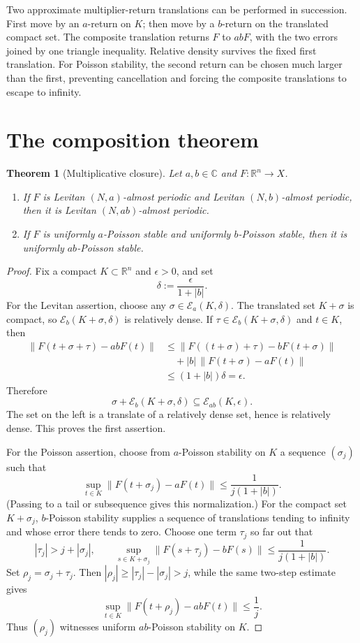 \documentclass[11pt]{article}
\newtheorem{theorem}{Theorem}
\newcommand{\Rd}{\mathbb R^n}
\newcommand{\E}{\mathcal E}
\begin{document}
Two approximate multiplier-return translations can be performed in
succession.  First move by an $a$-return on $K$; then move by a $b$-return
on the translated compact set.  The composite translation returns $F$ to
$abF$, with the two errors joined by one triangle inequality.  Relative
density survives the fixed first translation.  For Poisson stability, the
second return can be chosen much larger than the first, preventing
cancellation and forcing the composite translations to escape to infinity.

\section*{The composition theorem}

\begin{theorem}[Multiplicative closure]\label{thm:composition}
Let $a,b\in\mathbb C$ and $F:\Rd\to X$.
\begin{enumerate}
\item If $F$ is Levitan $(N,a)$-almost periodic and Levitan
      $(N,b)$-almost periodic, then it is Levitan $(N,ab)$-almost periodic.
\item If $F$ is uniformly $a$-Poisson stable and uniformly $b$-Poisson
      stable, then it is uniformly $ab$-Poisson stable.
\end{enumerate}
\end{theorem}

\begin{proof}
Fix a compact $K\subset\Rd$ and $\epsilon>0$, and set
\[
 \delta:=\frac{\epsilon}{1+|b|}.
\]
For the Levitan assertion, choose any
$\sigma\in\E_a(K,\delta)$.  The translated set $K+\sigma$ is compact, so
$\E_b(K+\sigma,\delta)$ is relatively dense.  If
$\tau\in\E_b(K+\sigma,\delta)$ and $t\in K$, then
\begin{align*}
 \|F(t+\sigma+\tau)-abF(t)\|
 &\le \|F((t+\sigma)+\tau)-bF(t+\sigma)\|\\
 &\quad+|b|\,\|F(t+\sigma)-aF(t)\|\\
 &\le (1+|b|)\delta=\epsilon.
\end{align*}
Therefore
\[
 \sigma+\E_b(K+\sigma,\delta)
 \subseteq \E_{ab}(K,\epsilon).
\]
The set on the left is a translate of a relatively dense set, hence is
relatively dense.  This proves the first assertion.

For the Poisson assertion, choose from $a$-Poisson stability on $K$ a
sequence $(\sigma_j)$ such that
\[
 \sup_{t\in K}\|F(t+\sigma_j)-aF(t)\|
 \le \frac{1}{j(1+|b|)}.
\]
(Passing to a tail or subsequence gives this normalization.)  For the
compact set $K+\sigma_j$, $b$-Poisson stability supplies a sequence of
translations tending to infinity and whose error there tends to zero.
Choose one term $\tau_j$ so far out that
\[
 |\tau_j|>j+|\sigma_j|,
 \qquad
 \sup_{s\in K+\sigma_j}\|F(s+\tau_j)-bF(s)\|
 \le\frac{1}{j(1+|b|)}.
\]
Set $\rho_j=\sigma_j+\tau_j$.  Then
$|\rho_j|\ge |\tau_j|-|\sigma_j|>j$, while the same two-step estimate gives
\[
 \sup_{t\in K}\|F(t+\rho_j)-abF(t)\|\le\frac1j.
\]
Thus $(\rho_j)$ witnesses uniform $ab$-Poisson stability on $K$.
\end{proof}
\end{document}

